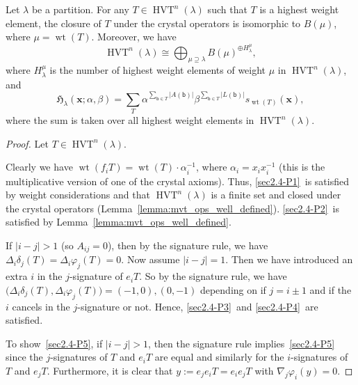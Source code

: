 \documentclass[ALCO,ThmDefs,Unicode,epreuves]{cedram}
\newcommand{\hG}{\mathfrak{H}}  %
\newcommand{\xx}{\mathbf{x}}
\newcommand{\iso}{\cong}
\newcommand{\bbb}{\mathsf{b}}
\newcommand{\abs}[1]{\lvert #1 \rvert}
\DeclareMathOperator{\wt}{wt} %
\DeclareMathOperator{\hvt}{HVT} %
\begin{document}
\begin{theo}
\label{thm:hvt_crystal_structure}
Let $\lambda$ be a partition.
For any $T \in \hvt^n(\lambda)$ such that $T$ is a highest weight element, the closure of $T$ under the crystal operators is isomorphic to $B(\mu)$, where $\mu = \wt(T)$.
Moreover, we have
\[
\hvt^n(\lambda) \iso \bigoplus_{\mu \supseteq \lambda} B(\mu)^{\oplus H_{\lambda}^{\mu}},
\]
where $H_{\lambda}^{\mu}$ is the number of highest weight elements of weight $\mu$ in $\hvt^n(\lambda)$, and
\[
\hG_{\lambda}(\xx; \alpha, \beta) = \sum_{T} \alpha^{\sum_{\bbb \in T} \abs{A(\bbb)}} \beta^{\sum_{\bbb \in T} \abs{L(\bbb)}} s_{\wt(T)}(\xx),
\]
where the sum is taken over all highest weight elements in $\hvt^n(\lambda)$.
\end{theo}

\begin{proof}
Let $T \in \hvt^n(\lambda)$.

Clearly we have $\wt(f_i T) = \wt(T) \cdot \alpha_i^{-1}$, where $\alpha_i = x_i x_i^{-1}$ (this is the multiplicative version of one of the crystal axioms).
Thus, \ref{sec2.4-P1}~is satisfied by weight considerations and that $\hvt^n(\lambda)$ is a finite set and closed under the crystal operators (Lemma~\ref{lemma:mvt_ops_well_defined}).
\ref{sec2.4-P2}~is satisfied by Lemma~\ref{lemma:mvt_ops_well_defined}.

If $\abs{i - j} > 1$ (so $A_{ij} = 0$), then by the signature rule, we have $\Delta_i \delta_j(T) = \Delta_i \varphi_j(T) = 0$.
Now assume $\abs{i-j} = 1$. Then we have introduced an extra $i$ in the $j$-signature of $e_i T$. So by the signature rule, we have $\bigl( \Delta_i \delta_j(T), \Delta_i \varphi_j(T) \bigr) = (-1, 0), (0, -1)$ depending on if $j = i \pm 1$ and if the $i$ cancels in the $j$-signature or not. Hence, \ref{sec2.4-P3}~and \ref{sec2.4-P4}~are satisfied.


To show~\ref{sec2.4-P5}, if $\abs{i - j} > 1$, then the signature rule implies~\ref{sec2.4-P5} since the $j$-signatures of $T$ and $e_i T$ are equal and similarly for the $i$-signatures of $T$ and $e_j T$. Furthermore, it is clear that $y := e_j e_i T = e_i e_j T$ with $\nabla_j \varphi_i(y) = 0$.


\end{proof}
\end{document}
